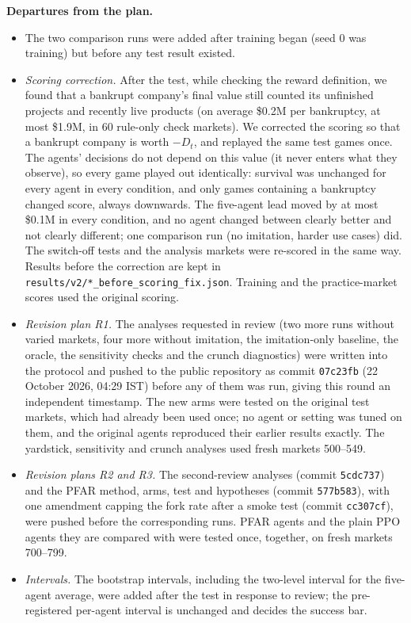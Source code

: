 \documentclass[11pt]{article}
\begin{document}
\textbf{Departures from the plan.}
\begin{itemize}
  \item The two comparison runs were added after training began (seed 0 was training) but before any test result existed.
  \item \emph{Scoring correction.} After the test, while checking the reward definition, we found that a bankrupt company's final value still counted its unfinished projects and recently live products (on average \$0.2M per bankruptcy, at most \$1.9M, in 60 rule-only check markets). We corrected the scoring so that a bankrupt company is worth $-D_t$, and replayed the same test games once. The agents' decisions do not depend on this value (it never enters what they observe), so every game played out identically: survival was unchanged for every agent in every condition, and only games containing a bankruptcy changed score, always downwards. The five-agent lead moved by at most \$0.1M in every condition, and no agent changed between clearly better and not clearly different; one comparison run (no imitation, harder use cases) did. The switch-off tests and the analysis markets were re-scored in the same way. Results before the correction are kept in \texttt{results/v2/*\_before\_scoring\_fix.json}. Training and the practice-market scores used the original scoring.
  \item \emph{Revision plan R1.} The analyses requested in review (two more runs without varied markets, four more without imitation, the imitation-only baseline, the oracle, the sensitivity checks and the crunch diagnostics) were written into the protocol and pushed to the public repository as commit \texttt{07c23fb} (22 October 2026, 04:29 IST) before any of them was run, giving this round an independent timestamp. The new arms were tested on the original test markets, which had already been used once; no agent or setting was tuned on them, and the original agents reproduced their earlier results exactly. The yardstick, sensitivity and crunch analyses used fresh markets 500--549.
  \item \emph{Revision plans R2 and R3.} The second-review analyses (commit \texttt{5cdc737}) and the PFAR method, arms, test and hypotheses (commit \texttt{577b583}), with one amendment capping the fork rate after a smoke test (commit \texttt{cc307cf}), were pushed before the corresponding runs. PFAR agents and the plain PPO agents they are compared with were tested once, together, on fresh markets 700--799.
  \item \emph{Intervals.} The bootstrap intervals, including the two-level interval for the five-agent average, were added after the test in response to review; the pre-registered per-agent interval is unchanged and decides the success bar.
\end{itemize}
\end{document}
